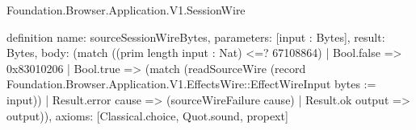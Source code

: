 \begin{lexlean}{Foundation.Browser.Application.V1.SessionWire}
\begin{semanticmodule}
definition{
  name: sourceSessionWireBytes,
  parameters: [input : Bytes],
  result: Bytes,
  body: (match ((prim length input : Nat) <=? 67108864)
    | Bool.false => 0x83010206
    | Bool.true => (match (readSourceWire (record Foundation.Browser.Application.V1.EffectsWire::EffectWireInput {bytes := input}))
      | Result.error cause => (sourceWireFailure cause)
      | Result.ok output => output)),
  axioms: [Classical.choice, Quot.sound, propext]
}
\end{semanticmodule}
\end{lexlean}
